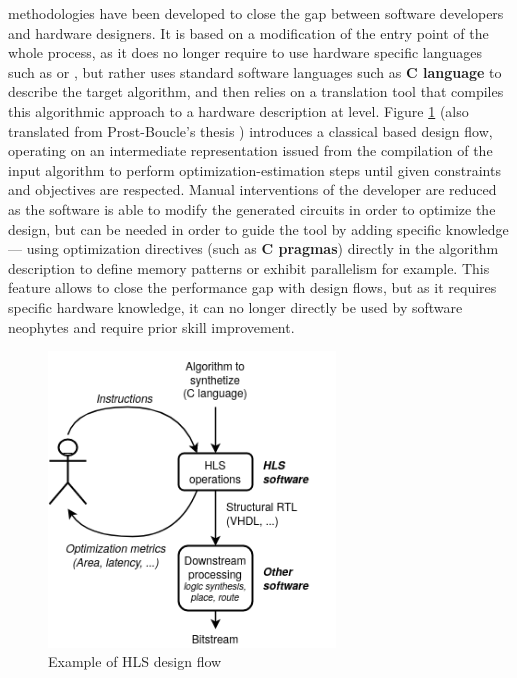          methodologies have been developed to close the gap between software developers and hardware designers.
        It is based on a modification of the entry point of the whole process, as it does no longer require to use hardware specific languages such as  or , but rather uses standard software languages such as {\bf C language} to describe the target algorithm, and then relies on a translation tool that compiles this algorithmic approach to a hardware description at  level.
        Figure \ref{ch.problem:sec.hardware:ssec.paradigms:fig.hls} (also translated from Prost-Boucle's thesis \cite{prost-boucle_generation_2014}) introduces a classical  based design flow, operating on an intermediate representation issued from the compilation of the input algorithm to perform optimization-estimation steps until given constraints and objectives are respected.
        Manual interventions of the developer are reduced as the software is able to modify the generated circuits in order to optimize the design, but can be needed in order to guide the tool by adding specific knowledge --- using optimization directives (such as {\bf C pragmas}) directly in the algorithm description to define memory patterns or exhibit parallelism for example.
        This feature allows to close the performance gap with  design flows, but as it requires specific hardware knowledge, it can no longer directly be used by software neophytes and require prior skill improvement.
        
        \begin{figure}[h!]
            \centering
            \includegraphics[width=0.68\textwidth]{Figures/HLS-flow.png}
            \caption{Example of HLS design flow}
            \label{ch.problem:sec.hardware:ssec.paradigms:fig.hls}
        \end{figure}

